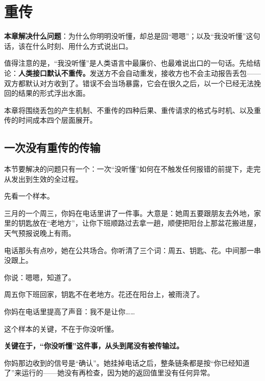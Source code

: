 \chapter{重传}


\begin{guideblock}
\textbf{本章解决什么问题}：为什么你明明没听懂，却总是回“嗯嗯”；以及“我没听懂”这句话，该在什么时刻、用什么方式说出口。
\end{guideblock}

值得注意的是，“我没听懂”是人类语言中最廉价、也最难说出口的一句话。先给结论：\textbf{人类接口默认不重传。}发送方不会自动重发，接收方也不会主动报告丢包——双方都默认对方收到了。错误不会当场暴露，它会在很久之后，以一个已经无法挽回的结果的形式浮出水面。

本章将围绕丢包的产生机制、不重传的四种后果、重传请求的格式与时机、以及重传的时间成本四个层面展开。

\hcirule

\section{一次没有重传的传输}

本节要解决的问题只有一个：一次“没听懂”如何在不触发任何报错的前提下，走完从发出到生效的全过程。

先看一个样本。

\par
\begin{mdquote}
三月的一个周三，你妈在电话里讲了一件事。大意是：她周五要跟朋友去外地，家里的钥匙放在“老地方”，让你下班顺路过去拿一趟，顺便把阳台上那盆花搬进屋，天气预报说晚上有雨。

电话那头有点吵，她在公共场合。你听清了三个词：周五、钥匙、花。中间那一串没跟上。

你说：嗯嗯，知道了。

周五你下班回家，钥匙不在老地方。花还在阳台上，被雨浇了。

你妈在电话里提高了声音：我不是让你……
\end{mdquote}

这个样本的关键，不在于你没听懂。

\textbf{关键在于，“你没听懂”这件事，从头到尾没有被传输过。}

你妈那边收到的信号是“确认”。她挂掉电话之后，整条链条都是按“你已经知道了”来运行的——她没有再检查，因为她的返回值里没有任何异常。

